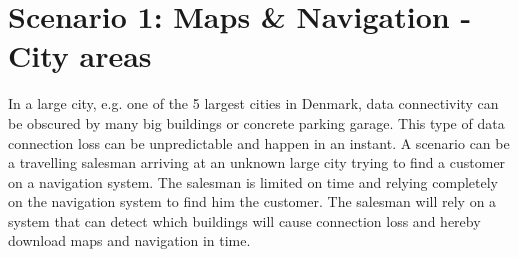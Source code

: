\section{Scenario 1: Maps \& Navigation - City areas}
In a large city, e.g. one of the 5 largest cities in Denmark, data connectivity can be obscured by many big buildings or concrete parking garage. This type of data connection loss can be unpredictable and happen in an instant. A scenario can be a travelling salesman arriving at an unknown large city trying to find a customer on a navigation system. The salesman is limited on time and relying completely on the navigation system to find him the customer. The salesman will rely on a system that can detect which buildings will cause connection loss and hereby download maps and navigation in time.